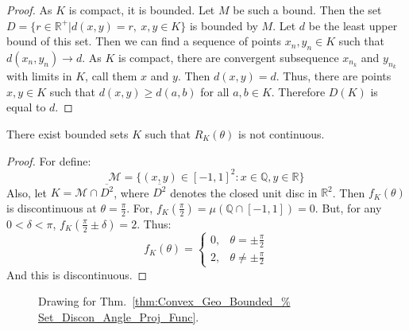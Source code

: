         \begin{proof}
        As $K$ is compact, it is bounded. Let $M$ be such a bound. Then the set $D=\{r\in \mathbb{R}^+| d(x,y) = r,\ x,y\in K\}$ is bounded by $M$. Let $d$ be the least upper bound of this set. Then we can find a sequence of points $x_n,y_n\in K$ such that $d(x_n,y_n) \rightarrow d$. As $K$ is compact, there are convergent subsequence $x_{n_k}$ and $y_{n_k}$ with limits in $K$, call them $x$ and $y$. Then $d(x,y) = d$. Thus, there are points $x,y\in K$ such that $d(x,y) \geq d(a,b)$ for all $a,b\in K$. Therefore $D(K)$ is equal to $d$.
        \end{proof}
        \begin{theorem}
            \label{thm:Convex_Geo_Bounded_Set_Discon_Angle_Proj_Func}
            There exist bounded sets $K$ such that $R_K(\theta)$
            is not continuous.
        \end{theorem}
        \begin{proof}
            For define:
            \begin{equation}
                \mathcal{M}=
                    \{(x,y)\in [-1,1]^2:
                        x\in\mathbb{Q},y\in \mathbb{R}\}
            \end{equation}
            Also, let $K=\mathcal{M}\cap\overline{D^{2}}$,
            where $\overline{D^{2}}$ denotes the closed unit
            disc in $\mathbb{R}^{2}$. Then $f_{K}(\theta)$ is
            discontinuous at $\theta=\frac{\pi}{2}$. For,
            $f_K(\frac{\pi}{2})=\mu(\mathbb{Q}\cap [-1,1])=0$. But,
            for any $0<\delta<\pi$,
            $f_K(\frac{\pi}{2}\pm\delta)=2$. Thus:
            \begin{equation}
                f_K(\theta)=
                    \begin{cases}
                        0,&\theta=\pm\frac{\pi}{2}\\
                        2,&\theta\ne\pm\frac{\pi}{2}
                    \end{cases}
            \end{equation}
            And this is discontinuous.
        \end{proof}
        \begin{figure}[H]
            \centering
            \captionsetup{type=figure}
            
            \caption{Drawing for Thm.~\ref{thm:Convex_Geo_Bounded_%
                Set_Discon_Angle_Proj_Func}.}
            \label{fig:Convex_Geo_Bounded_Set_Discon_Angle_Func}
        \end{figure}
